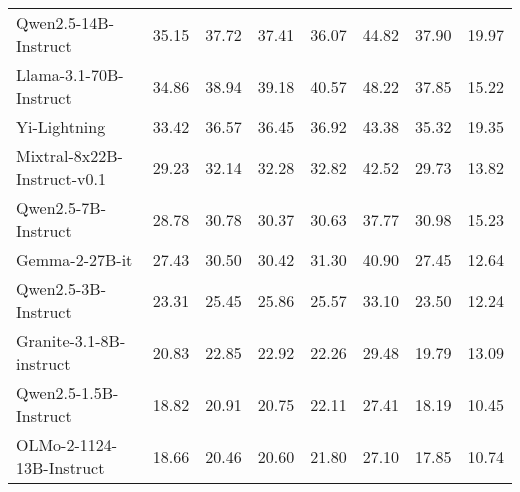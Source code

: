 {\begin{table}[p]
{\begin{tabular}{p{4.5cm}<{\raggedright\arraybackslash}*{7}{p{1.6cm}<{\centering\arraybackslash}}}
\rowcolor{color22}
Qwen2.5-14B-Instruct &35.15 & 37.72 & 37.41 & 36.07 & 44.82 & 37.90 &19.97 \\
\rowcolor{color22}
Llama-3.1-70B-Instruct &34.86 & 38.94 & 39.18 & 40.57 & 48.22 & 37.85 &15.22 \\
\rowcolor{color22}
Yi-Lightning &33.42 & 36.57 & 36.45 & 36.92 & 43.38 & 35.32 &19.35 \\
\rowcolor{color22}
Mixtral-8x22B-Instruct-v0.1 &29.23 & 32.14 & 32.28 & 32.82 & 42.52 & 29.73 &13.82 \\
\rowcolor{color22}
Qwen2.5-7B-Instruct &28.78 & 30.78 & 30.37 & 30.63 & 37.77 & 30.98 &15.23 \\
\rowcolor{color22}
Gemma-2-27B-it &27.43 & 30.50 & 30.42 & 31.30 & 40.90 & 27.45 &12.64 \\
\rowcolor{color22}
Qwen2.5-3B-Instruct &23.31 & 25.45 & 25.86 & 25.57 & 33.10 & 23.50 &12.24 \\
\rowcolor{color22}
Granite-3.1-8B-instruct &20.83 & 22.85 & 22.92 & 22.26 & 29.48 & 19.79 &13.09 \\
\rowcolor{color22}
Qwen2.5-1.5B-Instruct &18.82 & 20.91 & 20.75 & 22.11 & 27.41 & 18.19 &10.45 \\
\rowcolor{color22}
OLMo-2-1124-13B-Instruct &18.66 & 20.46 & 20.60 & 21.80 & 27.10 & 17.85 &10.74 \\

\end{tabular}}
\end{table}}

